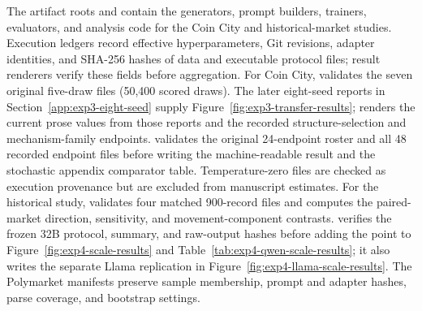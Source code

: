 The artifact roots 
and  contain the generators, prompt builders,
trainers, evaluators, and analysis code for the Coin City and historical-market
studies. Execution ledgers record effective hyperparameters, Git revisions,
adapter identities, and SHA-256 hashes of data and executable protocol files;
result renderers verify these fields before aggregation. For Coin City,
 validates the seven original five-draw
files (50,400 scored draws). The later eight-seed reports in
Section~\ref{app:exp3-eight-seed} supply Figure~\ref{fig:exp3-transfer-results};
 renders the current prose values from those
reports and the recorded structure-selection and mechanism-family endpoints.
 validates the original 24-endpoint roster and all
48 recorded endpoint files before writing the machine-readable result and the
stochastic appendix comparator table. Temperature-zero files are checked as
execution provenance but are excluded from manuscript estimates. For the
historical study,
 validates four matched 900-record files and
computes the paired-market direction, sensitivity, and movement-component
contrasts.  verifies the frozen 32B protocol,
summary, and raw-output hashes before adding the
point to Figure~\ref{fig:exp4-scale-results} and
Table~\ref{tab:exp4-qwen-scale-results}; it also writes the separate Llama
replication in Figure~\ref{fig:exp4-llama-scale-results}. The Polymarket
manifests preserve sample
membership, prompt and adapter hashes, parse coverage, and bootstrap settings.
